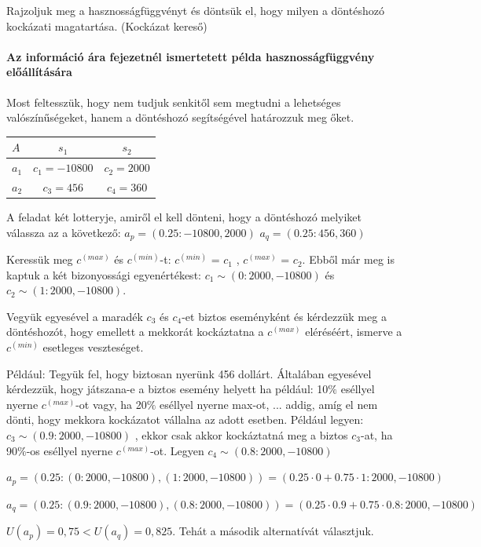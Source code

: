 \documentclass[a4paper,12pt]{article}
\begin{document}
Rajzoljuk meg a hasznosságfüggvényt és döntsük el, hogy milyen a döntéshozó kockázati magatartása. (Kockázat kereső)

\paragraph{Az információ ára fejezetnél ismertetett példa hasznosságfüggvény előállítására}

Most feltesszük, hogy nem tudjuk senkitől sem megtudni a lehetséges valószínűségeket, hanem a döntéshozó segítségével határozzuk meg őket.

\begin{center}
\begin{tabular}{l|c|c}
 $A$ & $s_1$ & $s_2$\\
\hline
  $a_1$  & $c_1 =  -10 800$ & $c_2 = 2 000$\\
  $a_2$ & $c_3 = 456$ & $c_4 = 360$ \\
\end{tabular}
\end{center}
A feladat két lotteryje, amiről el kell dönteni, hogy a döntéshozó melyiket válassza az a következő:
$a_p = (0.25: -10800, 2000)$
$a_q = (0.25: 456, 360)$

Keressük meg $c^{(max)}$ és $c^{(min)}$-t: $c^{(min)}$ = $c_1$ , $c^{(max)}$ = $c_2$. Ebből már meg is kaptuk a két bizonyossági egyenértékest: $c_1 \sim (0: 2000,-10800)$ és $c_2 \sim (1: 2000,-10800)$.

Vegyük egyesével a maradék $c_3$ és $c_4$-et biztos eseményként és kérdezzük meg a döntéshozót, hogy emellett a mekkorát kockáztatna a $c^{(max)}$ eléréséért, ismerve a $c^{(min)}$ esetleges veszteséget.

Például: Tegyük fel, hogy biztosan nyerünk 456 dollárt. Általában egyesével kérdezzük, hogy játszana-e a biztos esemény helyett ha például: 10$\%$ eséllyel nyerne $c^{(max)}$-ot vagy, ha 20$\%$ eséllyel nyerne max-ot, ... addig, amíg el nem dönti, hogy mekkora kockázatot vállalna az adott esetben. Például legyen: $c_3 \sim (0.9: 2000,-10800)$ , ekkor csak akkor kockáztatná meg a biztos $c_3$-at, ha 90$\%$-os eséllyel nyerne $c^{(max)}$-ot. Legyen $c_4 \sim (0.8: 2000,-10800)$ 

$a_p = (0.25:(0: 2000,-10800),(1: 2000,-10800)) = (0.25 \cdot 0 + 0.75 \cdot 1 : 2000,-10800)$

$a_q = (0.25:(0.9: 2000,-10800),(0.8: 2000,-10800)) = (0.25 \cdot 0.9 + 0.75 \cdot 0.8 : 2000,-10800)$

$U(a_p) = 0,75  < U(a_q) = 0,825$. Tehát a második alternatívát választjuk.
\end{document}
